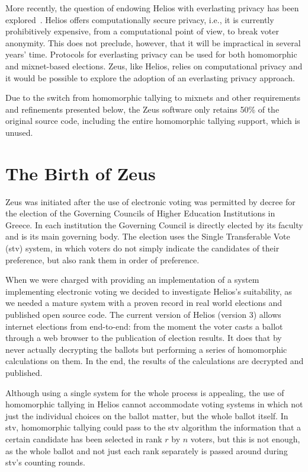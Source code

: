 \documentclass[letterpaper,10pt]{article}
\begin{document}
More recently, the question of endowing Helios with everlasting
privacy has been explored~\cite{demirel:2012}. Helios offers
computationally secure privacy, i.e., it is currently prohibitively
expensive, from a computational point of view, to break voter
anonymity. This does not preclude, however, that it will be
impractical in several years' time. Protocols for everlasting privacy
can be used for both homomorphic and mixnet-based elections. Zeus,
like Helios, relies on computational privacy and it would be possible
to explore the adoption of an everlasting privacy approach.

Due to the switch from homomorphic tallying to mixnets and other
requirements and refinements presented below, the Zeus software only
retains 50\% of the original source code, including the entire
homomorphic tallying support, which is unused.

\section{The Birth of Zeus}
\label{sec:birth}

Zeus was initiated after the use of electronic voting was permitted by
decree for the election of the Governing Councils of Higher Education
Institutions in Greece. In each institution the Governing Council is
directly elected by its faculty and is its main governing body. The
election uses the Single Transferable Vote ({\sc stv}) system, in which
voters do not simply indicate the candidates of their preference, but
also rank them in order of preference. 

When we were charged with providing an implementation of a system
implementing electronic voting we decided to investigate Helios's
suitability, as we needed a mature system with a proven record in real
world elections and published open source code. The current version of
Helios (version 3) allows internet elections from end-to-end: from the
moment the voter casts a ballot through a web browser to the
publication of election results. It does that by never actually
decrypting the ballots but performing a series of homomorphic
calculations on them. In the end, the results of the calculations are
decrypted and published. 

Although using a single system for the whole process is appealing, the
use of homomorphic tallying in Helios cannot accommodate voting
systems in which not just the individual choices on the ballot matter,
but the whole ballot itself. In {\sc stv}, homomorphic tallying could pass
to the {\sc stv} algorithm the information that a certain candidate has been
selected in rank $r$ by $n$ voters, but this is not enough, as the whole
ballot and not just each rank separately is passed around during {\sc stv}'s
counting rounds.
\end{document}
